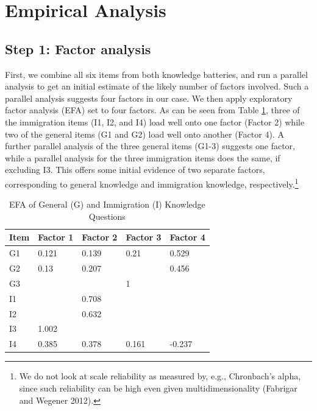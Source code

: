 \documentclass[11pt,halfline,a4paper,]{ouparticle}
\begin{document}
\hypertarget{empirical-analysis}{%
\section{Empirical Analysis}\label{empirical-analysis}}

\hypertarget{step-1-factor-analysis}{%
\subsection{Step 1: Factor analysis}\label{step-1-factor-analysis}}

First, we combine all six items from both knowledge batteries, and run a
parallel analysis to get an initial estimate of the likely number of
factors involved. Such a parallel analysis suggests four factors in our
case. We then apply exploratory factor analysis (EFA) set to four
factors. As can be seen from Table \ref{tab:tab2}, three of the
immigration items (I1, I2, and I4) load well onto one factor (Factor 2)
while two of the general items (G1 and G2) load well onto another
(Factor 4). A further parallel analysis of the three general items
(G1-3) suggests one factor, while a parallel analysis for the three
immigration items does the same, if excluding I3. This offers some
initial evidence of two separate factors, corresponding to general
knowledge and immigration knowledge, respectively.\footnote{We do not
  look at scale reliability as measured by, e.g., Chronbach's alpha,
  since such reliability can be high even given multidimensionality
  (Fabrigar and Wegener 2012).}

\begin{table}

\caption{\label{tab:tab2}EFA of General (G) and Immigration (I) Knowledge Questions}
\centering
\begin{tabular}[t]{lllll}
\toprule
Item & Factor 1 & Factor 2 & Factor 3 & Factor 4\\
\midrule
G1 & 0.121 & 0.139 & 0.21 & 0.529\\
G2 & 0.13 & 0.207 &  & 0.456\\
G3 &  &  & 1 & \\
I1 &  & 0.708 &  & \\
I2 &  & 0.632 &  & \\
\addlinespace
I3 & 1.002 &  &  & \\
I4 & 0.385 & 0.378 & 0.161 & -0.237\\
\bottomrule
\end{tabular}
\end{table}
\end{document}
